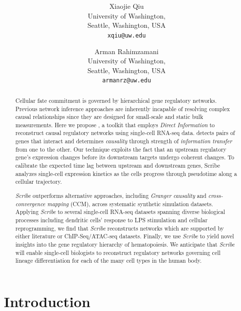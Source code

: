 \documentclass[10pt,oneside]{article}\usepackage[]{graphicx}\usepackage[]{color}
\title{\textsf{\textbf{\thetitle}}}
\author{Xiaojie Qiu\\[1em]University of Washington,\\ Seattle, Washington, USA\\
\texttt{xqiu@uw.edu} \and
Arman Rahimzamani\\[1em]University of Washington,\\ Seattle, Washington, USA\\
\texttt{armanrz@uw.edu}
}
\begin{document}








\maketitle
\begin{abstract}
Cellular fate commitment is governed by hierarchical gene regulatory networks. Previous network inference approaches are inherently incapable of resolving complex causal relationships since they are designed for small-scale and static bulk measurements. Here we propose , a toolkit that employs \emph{Direct Information} to reconstruct causal regulatory networks using single-cell RNA-seq data.  detects pairs of genes that interact and determines \emph{causality} through strength of \emph{information transfer} from one to the other. Our technique exploits the fact that an upstream regulatory gene's expression changes before its downstream targets undergo coherent changes. To calibrate the expected time lag between upstream and downstream genes, Scribe analyzes single-cell expression kinetics as the cells progress through pseudotime along a cellular trajectory.

\emph{Scribe} outperforms alternative approaches, including \emph{Granger causality} and \emph{cross-convergence mapping} (CCM), across systematic synthetic simulation datasets. Applying \emph{Scribe} to several single-cell RNA-seq datasets spanning diverse biological processes including dendritic cells' response to LPS stimulation and cellular reprogramming, we find that \emph{Scribe} reconstructs networks which are supported by either literature or ChIP-Seq/ATAC-seq datasets. Finally, we use \emph{Scribe} to yield novel insights into the gene regulatory hierarchy of hematopoiesis. We anticipate that \emph{Scribe} will enable single-cell biologists to reconstruct regulatory networks governing cell lineage differentiation for each of the many cell types in the human body. 
% 
\end{abstract}

\tableofcontents



\section{Introduction}
\end{document}
